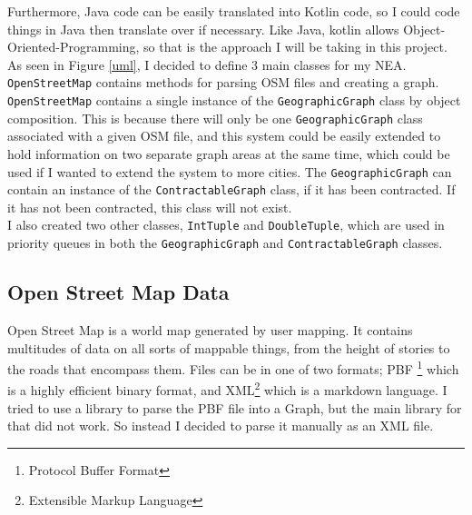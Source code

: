 \documentclass[11pt,twoside,a4paper]{report}
\begin{document}
Furthermore, Java code can be easily translated into Kotlin code, so I could code things in Java then translate over if necessary. Like Java, kotlin allows Object-Oriented-Programming, so that
is the approach I will be taking in this project.\\
As seen in Figure \ref{uml}, I decided to define 3 main classes for my NEA. \texttt{OpenStreetMap} contains methods for parsing OSM files and creating a graph.
\texttt{OpenStreetMap} contains a single instance of the \texttt{GeographicGraph} class by object composition. This is because there will only be one \texttt{GeographicGraph}
class associated with a given OSM file, and this system could be easily extended to hold information on two separate graph areas at the same time, which could be used if I wanted
to extend the system to more cities. The \texttt{GeographicGraph} can contain an instance of the \texttt{ContractableGraph} class, if it has been contracted. If it has not been contracted,
this class will not exist.\\
I also created two other classes, \texttt{IntTuple} and \texttt{DoubleTuple}, which are used in priority queues in both the \texttt{GeographicGraph} and \texttt{ContractableGraph} classes.\\
\subsection{Open Street Map Data}
Open Street Map is a world map generated by user mapping. It contains multitudes of data on all sorts of mappable things, from the height of stories to the roads that encompass them.
Files can be in one of two formats; PBF \footnote{Protocol Buffer Format} which is a highly efficient binary format, and XML\footnote{Extensible Markup Language} which is a markdown language. I tried to use a library to parse 
the PBF file into a Graph, but the main library for that did not work. So instead I decided to parse it manually as an XML file.\\
\end{document}

